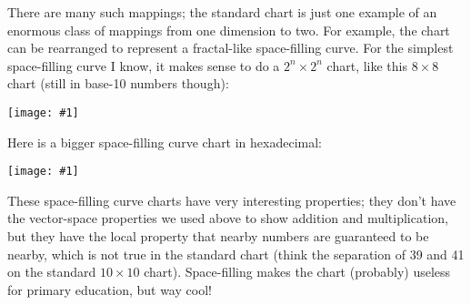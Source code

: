 \documentclass[12pt,pdftex]{article}
\newcommand{\showchart}[1]{\texttt{[image: \#1]}}
\begin{document}
There are many such mappings; the standard chart is just one example of
an enormous class of mappings from one dimension to two.  For example,
the chart can be rearranged to represent a fractal-like space-filling
curve.  For the simplest space-filling curve I know, it makes sense to
do a $2^n\times 2^n$ chart, like this $8\times 8$ chart (still in
base-10 numbers though):
\begin{center}
\showchart{hundreds_chart_8x8_base10_sfc.pdf}
\end{center}
Here is a bigger space-filling curve chart in hexadecimal:
\begin{center}
\showchart{hundreds_chart_16x16_base16_sfc.pdf}
\end{center}
These space-filling curve charts have very interesting properties;
they don't have the vector-space properties we used above to show
addition and multiplication, but they have the local property that
nearby numbers are guaranteed to be nearby, which is not true in the
standard chart (think the separation of 39 and 41 on the standard
$10\times 10$ chart).  Space-filling makes the chart (probably)
useless for primary education, but way cool!
\end{document}
